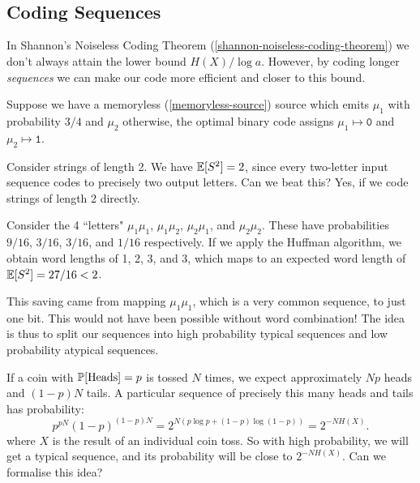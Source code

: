 \documentclass{article}
\begin{document}
\

\

\subsection{Coding Sequences}

In Shannon's Noiseless Coding Theorem (\ref{shannon-noiseless-coding-theorem}) we don't always attain the lower bound $H(X) / \log a$. However, by coding longer \textit{sequences} we can make our code more efficient and closer to this bound.

\begin{example}
    Suppose we have a memoryless (\ref{memoryless-source}) source which emits $\mu_1$ with probability $3/4$ and $\mu_2$ otherwise, the optimal binary code assigns $\mu_1 \mapsto \texttt{0}$ and $\mu_2 \mapsto \texttt{1}$.
    
    Consider strings of length 2. We have $\E[S^2] = 2$, since every two-letter input sequence codes to precisely two output letters. Can we beat this? Yes, if we code strings of length 2 directly.
    
    Consider the 4 ``letters" $\mu_1\mu_1$, $\mu_1\mu_2$, $\mu_2\mu_1$, and $\mu_2\mu_2$. These have probabilities $9/16$, $3/16$, $3/16$, and $1/16$ respectively. If we apply the Huffman algorithm, we obtain word lengths of 1, 2, 3, and 3, which maps to an expected word length of $\E[S^2] = 27/16 < 2$.
    
    This saving came from mapping $\mu_1 \mu_1$, which is a very common sequence, to just one bit. This would not have been possible without word combination! The idea is thus to split our sequences into high probability typical sequences and low probability atypical sequences.
\end{example}

If a coin with $\P[\text{Heads}] = p$ is tossed $N$ times, we expect approximately $Np$ heads and $(1-p)N$ tails. A particular sequence of precisely this many heads and tails has probability:
\[
p^{pN} (1-p)^{(1-p)N} = 2^{N(p \log p + (1-p)\log(1-p))} = 2^{-NH(X)}.
\]
where $X$ is the result of an individual coin toss. So with high probability, we will get a typical sequence, and its probability will be close to $2^{-NH(X)}$. Can we formalise this idea?
\end{document}
